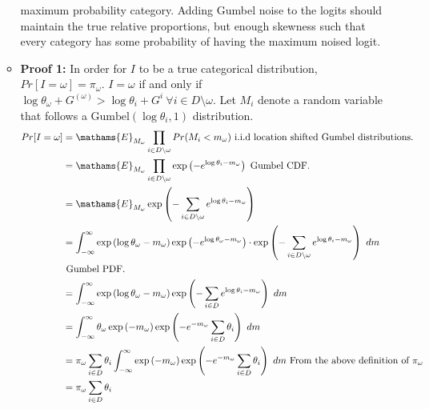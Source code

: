 \documentclass[
  11pt,
  letterpaper,
]{article}
\begin{document}
\begin{itemize}
\begin{itemize}
    maximum probability category. Adding Gumbel noise to the logits
    should maintain the true relative proportions, but enough skewness
    such that every category has some probability of having the maximum
    noised logit.
  \item
    \textbf{Proof 1:} In order for \(I\) to be a true categorical
    distribution, \(Pr[I = \omega] = \pi_\omega\). \(I = \omega\) if and
    only if
    \(\log \theta_\omega + G^{(\omega)} > \log \theta_i + G^{i} \   \forall i \in D \setminus \omega\).
    Let \(M_i\) denote a random variable that follows a
    \(\text{Gumbel}(\log \theta_i, 1)\) distribution. \begin{align*}
      Pr[I = \omega] 
          &= \mathams{E}_{M_\omega} 
              \prod_{i \in D \setminus \omega} Pr(M_i < m_\omega) 
              \text{ i.i.d location shifted Gumbel distributions.} \\ 
          &= \mathams{E}_{M_\omega} 
              \prod_{i \in D \setminus \omega} \exp 
                  \left(-e^{\log \theta_i - m_\omega} \right)
              \text{ Gumbel CDF.} \\ 
          &= \mathams{E}_{M_\omega} 
              \exp \left(-\sum_{i \in D \setminus \omega}
              e^{\log \theta_i - m_\omega} \right) \\ 
          &= \int_{-\infty}^{\infty}
              \exp \left( \log \theta_\omega - m_\omega \right) 
              \exp \left(-e^{\log \theta_\omega - m_\omega} \right) \cdot 
              \exp \left (-\sum_{i \in D \setminus \omega}
              e^{\log \theta_i - m_\omega} \right) \ dm \\
              &\text{ Gumbel PDF.} \\
          &= \int_{-\infty}^{\infty}
              \exp \left( \log \theta_\omega - m_\omega \right) 
              \exp \left (-\sum_{i \in D}
              e^{\log \theta_i - m_\omega} \right) \ dm \\
          &= \int_{-\infty}^{\infty}
              \theta_\omega 
              \exp \left( -m_\omega \right) 
              \exp \left( -e^{-m_\omega} \sum_{i \in D}
                  \theta_i  \right) \ dm \\
          &= \pi_\omega \sum_{i \in D} \theta_i
          \int_{-\infty}^{\infty}
              \exp \left( -m_\omega \right) 
              \exp \left( -e^{-m_\omega} \sum_{i \in D}
                  \theta_i  \right) \ dm 
                  \text{ From the above definition of } \pi_\omega \\
          &= \pi_\omega \sum_{i \in D} \theta_i

\end{align*}
\end{itemize}
\end{itemize}
\end{document}
